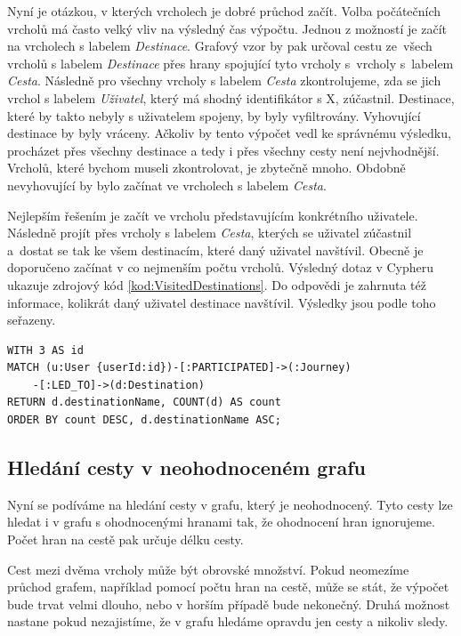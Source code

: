 \documentclass[
  program=infoi,
  biblatex=true,
  figures=true,
  glossaries=false,
  index,
  sourcecodes=true
]{kidiplom}
\begin{document}
Nyní je otázkou, v kterých vrcholech je dobré průchod začít. Volba počátečních vrcholů má často velký vliv na výsledný čas výpočtu. Jednou z možností je začít na vrcholech s labelem \textit{Destinace}. Grafový vzor by pak určoval cestu ze~všech vrcholů s labelem \textit{Destinace} přes hrany spojující tyto vrcholy s~vrcholy s~labelem \textit{Cesta}. Následně pro všechny vrcholy s labelem \textit{Cesta} zkontrolujeme, zda se jich vrchol s labelem \textit{Uživatel}, který má shodný identifikátor s X, zúčastnil. Destinace, které by takto nebyly s uživatelem spojeny, by byly vyfiltrovány. Vyhovující destinace by byly vráceny. Ačkoliv by tento výpočet vedl ke správnému výsledku, procházet přes všechny destinace a tedy i přes všechny cesty není nejvhodnější. Vrcholů, které bychom museli zkontrolovat, je zbytečně mnoho. Obdobně nevyhovující by bylo začínat ve vrcholech s labelem \textit{Cesta}.

Nejlepším řešením je začít ve vrcholu představujícím konkrétního uživatele. Následně projít přes vrcholy s labelem \textit{Cesta}, kterých se uživatel zúčastnil a~dostat se tak ke všem destinacím, které daný uživatel navštívil. Obecně je doporučeno začínat v co nejmenším počtu vrcholů. Výsledný dotaz v Cypheru ukazuje zdrojový kód \ref{kod:VisitedDestinations}. Do odpovědi je zahrnuta též informace, kolikrát daný uživatel destinace navštívil. Výsledky jsou podle toho seřazeny.

\begin{listing}[h]
\begin{verbatim}
WITH 3 AS id
MATCH (u:User {userId:id})-[:PARTICIPATED]->(:Journey)
	-[:LED_TO]->(d:Destination)
RETURN d.destinationName, COUNT(d) AS count
ORDER BY count DESC, d.destinationName ASC;
\end{verbatim}
\caption[Předdefinovaná cesta.]{Ukázka kódu dotazu využívajícího předdefinovanou cestu.}
\label{kod:VisitedDestinations}
\end{listing}

\subsection{Hledání cesty v neohodnoceném grafu}
\label{sec:unweightedPath}
Nyní se podíváme na hledání cesty v grafu, který je neohodnocený. Tyto cesty lze hledat i v grafu s ohodnocenými hranami tak, že ohodnocení hran ignorujeme. Počet hran na cestě pak určuje délku cesty.

Cest mezi dvěma vrcholy může být obrovské množství. Pokud neomezíme průchod grafem, například pomocí počtu hran na cestě, může se stát, že výpočet bude trvat velmi dlouho, nebo v horším případě bude nekonečný. Druhá možnost nastane pokud nezajistíme, že v grafu hledáme opravdu jen cesty a nikoliv sledy.
\end{document}
